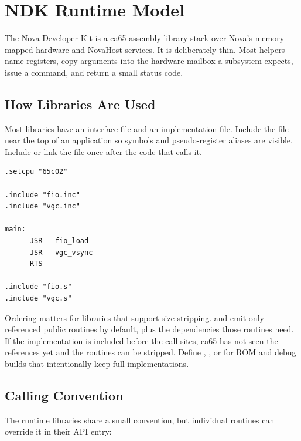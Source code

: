 \chapter{NDK Runtime Model}

The Nova Developer Kit is a ca65 assembly library stack over Nova's
memory-mapped hardware and NovaHost services. It is deliberately thin. Most
helpers name registers, copy arguments into the hardware mailbox a subsystem
expects, issue a command, and return a small status code.

\begin{center}
\end{center}

\section{How Libraries Are Used}

Most libraries have an interface file and an implementation file. Include the
 file near the top of an application so symbols and
pseudo-register aliases are visible. Include or link the  file
once after the code that calls it.

\begin{lstlisting}
.setcpu "65c02"

.include "fio.inc"
.include "vgc.inc"

main:
      JSR   fio_load
      JSR   vgc_vsync
      RTS

.include "fio.s"
.include "vgc.s"
\end{lstlisting}

Ordering matters for libraries that support size stripping. 
and  emit only referenced public routines by default, plus the
dependencies those routines need. If the implementation is included before the
call sites, ca65 has not seen the references yet and the routines can be
stripped. Define ,
, or 
for ROM and debug builds that intentionally keep full implementations.

\section{Calling Convention}

The runtime libraries share a small convention, but individual routines can
override it in their API entry:

